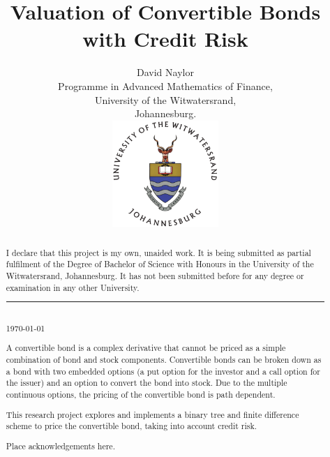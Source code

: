 \documentclass[a4paper,11pt,oneside]{report}
\title{Valuation of Convertible Bonds with Credit Risk}
\author{David Naylor\\[2cm]
Programme in Advanced Mathematics of Finance,\\
University of the Witwatersrand,\\
Johannesburg.\\[2cm]
\includegraphics[width=4cm]{../common/WitsColourLogo}\\[2cm]
}
\newcommand{\setlinespacing}[1]
           {\renewcommand{\baselinestretch}{#1}\small\normalsize}
\theoremstyle{plain}
\theoremstyle{definition}
\begin{document}
\maketitle \setlinespacing{1.20}


\def\abstractname{\Huge Declaration}
\begin{abstract}
I declare that this project is my own, unaided work. It is being submitted as partial fulfilment of the Degree of Bachelor of Science with Honours in the University of the Witwatersrand, Johannesburg. It has not been submitted before for any degree or examination in any other University.\\[3cm]
\noindent\rule{5cm}{0.5pt}\\[1cm]
\noindent \today
\end{abstract}


\def\abstractname{\Huge Abstract}
\begin{abstract}
A convertible bond is a complex derivative that cannot be priced as a simple combination of bond and stock components.  Convertible bonds can be broken down as a bond with two embedded options (a put option for the investor and a call option for the issuer) and an option to convert the bond into stock.  Due to the multiple continuous options, the pricing of the convertible bond is path dependent.

This research project explores and implements a binary tree and finite difference scheme to price the convertible bond, taking into account credit risk.
\end{abstract}


\def\abstractname{\Huge Acknowledgements}
\begin{abstract}
Place acknowledgements here.
\end{abstract}


\setlinespacing{1}
\tableofcontents
\listoffigures
\listoftables
\clearpage
\setlinespacing{1.20}
\setcounter{page}{1}

\end{document}
